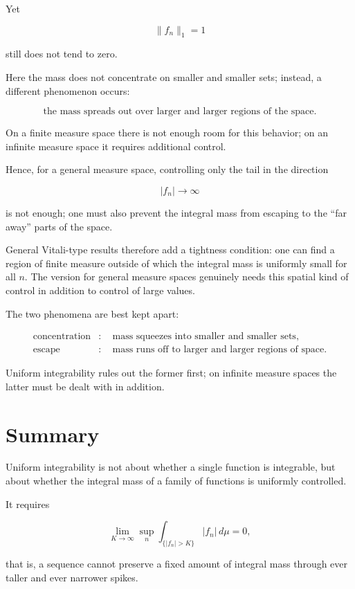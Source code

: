\documentclass[11pt]{article}
\begin{document}
Yet

\[
\|f_n\|_1=1
\]

still does not tend to zero.

Here the mass does not concentrate on smaller and smaller sets; instead, a different phenomenon occurs:

\[
\text{the mass spreads out over larger and larger regions of the space.}
\]

On a finite measure space there is not enough room for this behavior; on an infinite measure space it requires additional control.

Hence, for a general measure space, controlling only the tail in the direction

\[
|f_n|\to\infty
\]

is not enough; one must also prevent the integral mass from escaping to the ``far away'' parts of the space.

General Vitali-type results therefore add a tightness condition: one can find a region of finite measure outside of which the integral mass is uniformly small for all $n$. The version for general measure spaces genuinely needs this spatial kind of control in addition to control of large values.

The two phenomena are best kept apart:

\[
\boxed{
\begin{aligned}
\text{concentration}
&:\quad
\text{mass squeezes into smaller and smaller sets},\\
\text{escape}
&:\quad
\text{mass runs off to larger and larger regions of space}.
\end{aligned}
}
\]

Uniform integrability rules out the former first; on infinite measure spaces the latter must be dealt with in addition.


\section*{Summary}


Uniform integrability is not about whether a single function is integrable, but about whether the integral mass of a family of functions is uniformly controlled.

It requires

\[
\lim_{K\to\infty}
\sup_n
\int_{\{|f_n|>K\}}
|f_n|\,d\mu
=
0,
\]

that is, a sequence cannot preserve a fixed amount of integral mass through ever taller and ever narrower spikes.
\end{document}
